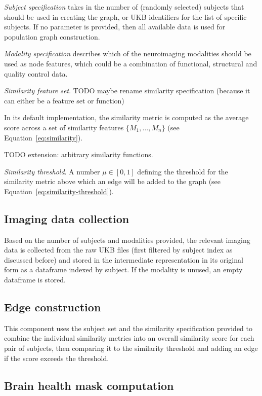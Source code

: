 \textit{Subject specification} takes in the number of (randomly selected) subjects that should be used in creating the graph, or UKB identifiers for the list of specific subjects. If no parameter is provided, then all available data is used for population graph construction.

\textit{Modality specification} describes which of the neuroimaging modalities should be used as node features, which could be a combination of functional, structural and quality control data.

\textit{Similarity feature set}. 
TODO maybe rename similarity specification (because it can either be a feature set or function)

In its default implementation, the similarity metric is computed as the average score across a set of similarity features $\{M_1, \dots, M_n\}$ (see Equation~\eqref{eq:similarity}). 

TODO extension: arbitrary similarity functions.

\textit{Similarity threshold}. A number $\mu \in [0,1]$ defining the threshold for the similarity metric above which an edge will be added to the graph (see Equation~\eqref{eq:similarity-threshold}).

\subsection{Imaging data collection}

Based on the number of subjects and modalities provided, the relevant imaging data is collected from the raw UKB files (first filtered by subject index as discussed before) and stored in the intermediate representation in its original form as a dataframe indexed by subject. If the modality is unused, an empty dataframe is stored.


\subsection{Edge construction}

This component uses the subject set and the similarity specification provided to combine the individual similarity metrics into an overall similarity score for each pair of subjects, then comparing it to the similarity threshold and adding an edge if the score exceeds the threshold.

\subsection{Brain health mask computation}

